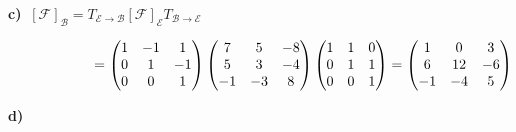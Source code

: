 \begin{solution}
    \textbf{c)} \( \ [\mathcal{F}]_{\mathcal{B}} = T_{\mathcal{E} \to \mathcal{B}} [\mathcal{F}]_{\mathcal{E}} T_{\mathcal{B} \to \mathcal{E}} \)

    \begin{equation*}
        = \begin{pmatrix}
            1 & -1 & 1 \\
            0 & 1 & -1 \\
            0 & 0 & 1
        \end{pmatrix} \begin{pmatrix}
            7 & 5 & -8 \\
            5 & 3 & -4 \\
            -1 & -3 & 8
        \end{pmatrix} \begin{pmatrix}
            1 & 1 & 0 \\
            0 & 1 & 1 \\
            0 & 0 & 1
        \end{pmatrix} = \begin{pmatrix}
            1 & 0 & 3 \\
            6 & 12 & -6 \\
            -1 & -4 & 5
        \end{pmatrix} \hspace{-2.18cm}
    \end{equation*}

    \textbf{d)} 


\end{solution}

